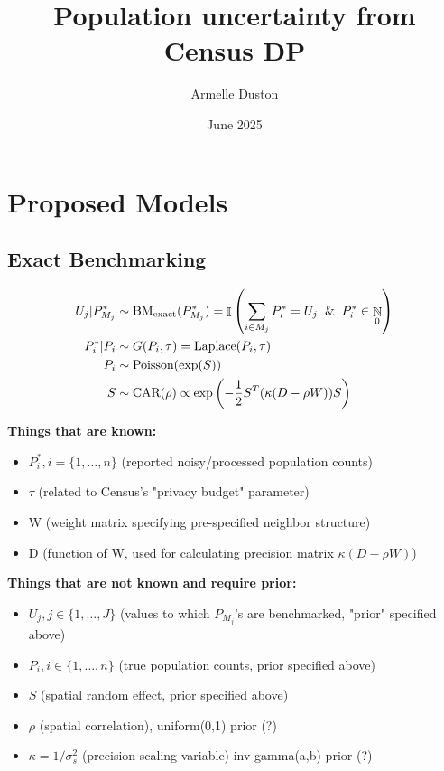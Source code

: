 \documentclass[12pt]{article}
\title{Population uncertainty from Census DP}
\author{Armelle Duston}
\date{June 2025}
\DeclareMathOperator{\N}{\mathbb{N}}
\DeclareMathOperator{\I}{\mathbb{I}}
\begin{document}
\maketitle

\section{Proposed Models}

\subsection{Exact Benchmarking}

\begin{align}
    U_j |P_{M_j}^* &\sim \text{BM}_{\text{exact}}(P_{M_j}^*)  = \I \left( \sum_{i \in M_j} P_i^* = U_j \And P_i^* \in \N_0 \right) \\
    P_i^* | P_i &\sim G(P_i, \tau) = \text{Laplace}( P_i, \tau)  \\
    P_i &\sim \text{Poisson}(\exp(S))\\
    S &\sim \text{CAR}(\rho) \propto \exp \left( - \frac{1}{2} S^T(\kappa (D- \rho W)) S \right)
\end{align}

\textbf{Things that are known:} 
\begin{itemize}
    \item $P_i^*, i = \{1, \dots, n\}$ (reported noisy/processed population counts)
    \item $\tau$ (related to Census's "privacy budget" parameter)
    \item W (weight matrix specifying pre-specified neighbor structure)
    \item D (function of W, used for calculating precision matrix $\kappa (D- \rho W)$)
\end{itemize}

\textbf{Things that are not known and require prior:}
\begin{itemize}
    \item $U_j, j \in \{1, \dots, J\}$ (values to which $P_{M_j}$'s are benchmarked, "prior" specified above)
    \item $P_i, i \in \{1, \dots, n\}$ (true population counts, prior specified above)
    \item $S$ (spatial random effect, prior specified above)
    \item $\rho$ (spatial correlation), uniform(0,1) prior (?)
    \item $\kappa = 1/\sigma^2_s$ (precision scaling variable) inv-gamma(a,b) prior (?)
\end{itemize}
\end{document}
